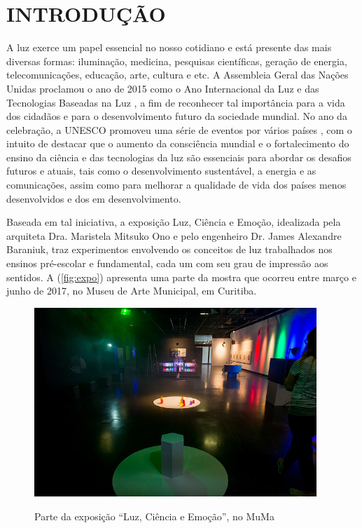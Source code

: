 
\chapter{INTRODUÇÃO}
\label{chap:introducao}

  A luz exerce um papel essencial no nosso cotidiano e está presente das mais diversas formas: iluminação, medicina, pesquisas científicas, geração de energia, telecomunicações, educação, arte, cultura e etc. A Assembleia Geral das Nações Unidas proclamou o ano de 2015 como o Ano Internacional da Luz e das Tecnologias Baseadas na Luz \cite{resolucao-onu}, a fim de reconhecer tal importância para a vida dos cidadãos e para o desenvolvimento futuro da sociedade mundial. No ano da celebração, a UNESCO promoveu uma série de eventos por vários países , com o intuito de destacar que o aumento da consciência mundial e o fortalecimento do ensino da ciência e das tecnologias da luz são essenciais para abordar os desafios futuros e atuais, tais como o desenvolvimento sustentável, a energia e as comunicações, assim como para melhorar a qualidade de vida dos países menos desenvolvidos e dos em desenvolvimento.
  
  Baseada em tal iniciativa, a exposição Luz, Ciência e Emoção, idealizada pela arquiteta Dra. Maristela Mitsuko Ono e pelo engenheiro Dr. James Alexandre Baraniuk, traz experimentos envolvendo os conceitos de luz trabalhados nos ensinos pré-escolar e fundamental, cada um com seu grau de impressão aos sentidos. A (\autoref{fig:expo}) apresenta uma parte da mostra que ocorreu entre março e junho de 2017, no Museu de Arte Municipal, em Curitiba.
  
  \begin{figure}[H]%
    \centering
    \caption{Parte da exposição ``Luz, Ciência e Emoção'', no MuMa}
    \includegraphics[width=0.95\textwidth]{./dados/figuras/expo}
    \label{fig:expo}
\end{figure}
  
